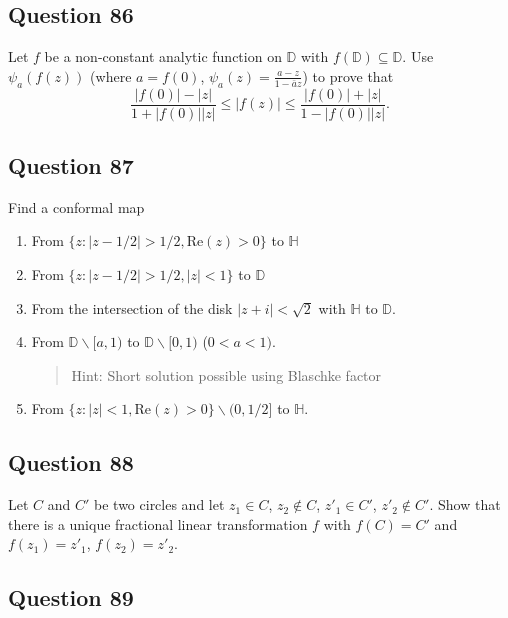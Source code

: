 \documentclass[12pt]{article}
\begin{document}
\hypertarget{question-86-1}{%
\subsection{Question 86}\label{question-86-1}}

Let \(f\) be a non-constant analytic function on \(\mathbb D\) with
\(f(\mathbb D) \subseteq \mathbb D\). Use \(\psi_{a} (f(z))\) (where
\(a=f(0)\), \(\displaystyle \psi_a(z) = \frac{a - z}{1 - \bar{a}z}\)) to
prove that \[\displaystyle
\frac{|f(0)| - |z|}{1 + |f(0)||z|} \leq |f(z)| \leq
\frac{|f(0)| + |z|}{1 - |f(0)||z|}.\]

\hypertarget{question-87-1}{%
\subsection{Question 87}\label{question-87-1}}

Find a conformal map

\begin{enumerate}
\def\labelenumi{\arabic{enumi}.}
\item
  From \(\{ z: |z - 1/2| > 1/2, \text{Re}(z)>0 \}\) to \(\mathbb H\)
\item
  From \(\{ z: |z - 1/2| > 1/2, |z| <1 \}\) to \(\mathbb D\)
\item
  From the intersection of the disk \(|z + i| < \sqrt{2}\) with
  \({\mathbb H}\) to \({\mathbb D}\).
\item
  From \({\mathbb D} \backslash [a, 1)\) to
  \({\mathbb D} \backslash [0, 1)\) (\(0<a<1)\).

  \begin{quote}
  Hint: Short solution possible using Blaschke factor
  \end{quote}
\item
  From \(\{ z: |z| < 1, \text{Re}(z) > 0 \} \backslash (0, 1/2]\) to
  \(\mathbb H\).
\end{enumerate}

\hypertarget{question-88-1}{%
\subsection{Question 88}\label{question-88-1}}

Let \(C\) and \(C'\) be two circles and let \(z_1 \in C\),
\(z_2 \notin C\), \(z'_1 \in C'\), \(z'_2 \notin C'\). Show that there
is a unique fractional linear transformation \(f\) with \(f(C) = C'\)
and \(f(z_1) = z'_1\), \(f(z_2) = z'_2\).

\hypertarget{question-89-1}{%
\subsection{Question 89}\label{question-89-1}}
\end{document}
